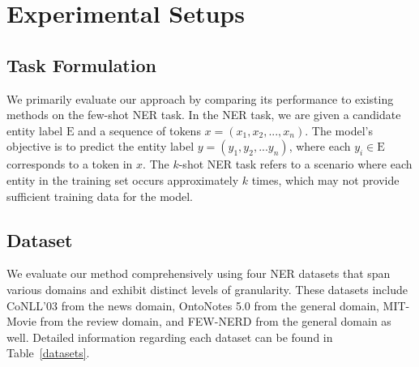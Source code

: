 \documentclass[11pt]{article}
\begin{document}
\section{Experimental Setups}
\subsection{Task Formulation}
We primarily evaluate our approach by comparing its performance to existing methods on the few-shot NER task. 
In the NER task, we are given a candidate entity label $\mathrm{E}$ and a sequence of tokens $x = (x_1, x_2, ..., x_n)$. The model's objective is to predict the entity label $y = (y_1, y_2, ... y_n)$, where each $y_i \in \mathrm{E}$ corresponds to a token in $x$.
The $k$-shot NER task refers to a scenario where each entity in the training set occurs approximately $k$ times, which may not provide sufficient training data for the model.



\begin{table}[!t]
    \centering
    \caption{Statistics for datasets. 
    The ``$k$-shot'' column represents the number of data sampled in that scenario.
    }
    \label{datasets}
\end{table}

\subsection{Dataset}

We evaluate our method comprehensively using four NER datasets that span various domains and exhibit distinct levels of granularity. These datasets include CoNLL'03 \cite{conll} from the news domain, OntoNotes 5.0 \cite{ontonotes} from the general domain, MIT-Movie \cite{Mit-movie} from the review domain, and FEW-NERD \cite{FEW-NERD} from the general domain as well. Detailed information regarding each dataset can be found in Table~\ref{datasets}.
\end{document}
